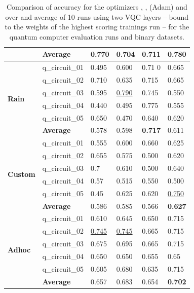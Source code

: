 \begin{table}[!h]
{\begin{tabular}{p{}p{}|p{}p{}p{}p{}}
    		                        & \textbf{Average} & 0.770  & 0.704 & 0.711    & \textbf{0.780} \\
    		\hline
    		\multirow{6}{*}{\textbf{Rain}}   & q\_circuit\_01 & 0.495  & 0.600 & 0.71 0  & 0.665 \\
    		                        & q\_circuit\_02 & 0.710  & 0.635 & 0.715    & 0.665 \\
    		                        & q\_circuit\_03 & 0.595  & \underline{0.790} & 0.745    & 0.550 \\
    		                        & q\_circuit\_04 & 0.440  & 0.495 & 0.775    & 0.555 \\
    		                        & q\_circuit\_05 & 0.650  & 0.470 & 0.640   & 0.620 \\
    		\cline{2-6} 
    		                        & \textbf{Average} & 0.578  & 0.598 & \textbf{0.717}    & 0.611 \\
    		\hline
    		\multirow{6}{*}{\textbf{Custom}} & q\_circuit\_01  & 0.555  & 0.600 & 0.660    & 0.625 \\
    		                        & q\_circuit\_02  & 0.655  & 0.575 & 0.500    & 0.620 \\
    		                        & q\_circuit\_03  & 0.7  & 0.610 & 0.500    & 0.640 \\
    		                        & q\_circuit\_04  & 0.57  & 0.515 & 0.550    & 0.500 \\
    		                        & q\_circuit\_05  & 0.45  & 0.625 & 0.620    & \underline{0.750} \\
    		\cline{2-6} 
    		                        & \textbf{Average} & 0.586  & 0.585 & 0.566    & \textbf{0.627} \\
    		\hline 
    		\multirow{6}{*}{\textbf{Adhoc}}  & q\_circuit\_01  & 0.610  & 0.645 & 0.650    & 0.715 \\
    		                        & q\_circuit\_02 & \underline{0.745}  & \underline{0.745} & 0.665    & 0.715 \\
    		                        & q\_circuit\_03 & 0.675  & 0.695 & 0.665    & 0.715 \\
    		                        & q\_circuit\_04 & 0.650  & 0.650 & 0.655    & 0.65 \\
    		                        & q\_circuit\_05 & 0.605  & 0.680 & 0.635    & 0.715 \\
    		\cline{2-6} 
    		                        & \textbf{Average} & 0.657  & 0.683 & 0.654    & \textbf{0.702} \\
    		\hline 
    	\end{tabular}
    }
	\caption{Comparison of accuracy for the optimizers , ,  (Adam) and  over and average of 10 runs using two VQC layers – bound to the weights of the highest scoring trainings run – for the quantum computer evaluation runs and binary datasets.}
	\label{table:accuracy_comparison_binary_dataset_and_optimizers_evaluation_runs}
\end{table}

